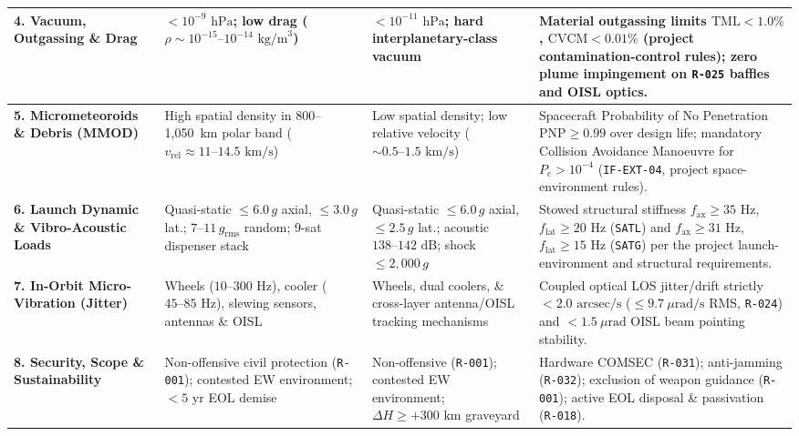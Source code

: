 \documentclass[11pt,a4paper]{article}
\providecommand{\abbr}[1]{#1}
\begin{document}
\begin{table}[H]
{\begin{tabularx}{\textwidth}{|>{\raggedright\arraybackslash}p{2.4cm}|>{\raggedright\arraybackslash}p{2.8cm}|>{\raggedright\arraybackslash}p{2.8cm}|>{\raggedright\arraybackslash}X|}
    \textbf{4. Vacuum, Outgassing \& Drag} & $< 10^{-9}\text{ hPa}$; low drag ($\rho \sim 10^{-15}\text{--}10^{-14}\text{ kg/m}^3$) & $< 10^{-11}\text{ hPa}$; hard interplanetary-class vacuum & Material outgassing limits $\mathrm{TML} < 1.0\%$, $\mathrm{CVCM} < 0.01\%$ (project contamination-control rules); zero plume impingement on \texttt{R-025} baffles and \abbr{OISL} optics. \\ \hline
    \textbf{5. Micrometeoroids \& Debris (\abbr{MMOD})} & High spatial density in 800--1,050~km polar band ($v_{\text{rel}} \approx 11\text{--}14.5\text{ km/s}$) & Low spatial density; low relative velocity ($\sim 0.5\text{--}1.5\text{ km/s}$) & Spacecraft Probability of No Penetration $\text{PNP} \ge 0.99$ over design life; mandatory Collision Avoidance Manoeuvre for $P_c > 10^{-4}$ (\texttt{IF-EXT-04}, project space-environment rules). \\ \hline
    \textbf{6. Launch Dynamic \& Vibro-Acoustic Loads} & Quasi-static $\le 6.0\,g$ axial, $\le 3.0\,g$ lat.; $7\text{--}11\,g_{\text{rms}}$ random; 9-sat dispenser stack & Quasi-static $\le 6.0\,g$ axial, $\le 2.5\,g$ lat.; acoustic $138\text{--}142\text{ dB}$; shock $\le 2{,}000\,g$ & Stowed structural stiffness $f_{\text{ax}} \ge 35\text{ Hz}$, $f_{\text{lat}} \ge 20\text{ Hz}$ (\texttt{SATL}) and $f_{\text{ax}} \ge 31\text{ Hz}$, $f_{\text{lat}} \ge 15\text{ Hz}$ (\texttt{SATG}) per the project launch-environment and structural requirements. \\ \hline
    \textbf{7. In-Orbit Micro-Vibration (Jitter)} & Wheels ($10\text{--}300\text{ Hz}$), cooler ($45\text{--}85\text{ Hz}$), slewing sensors, antennas \& \abbr{OISL} & Wheels, dual coolers, \& cross-layer antenna/\abbr{OISL} tracking mechanisms & Coupled optical \abbr{LOS} jitter/drift strictly $< 2.0\text{ arcsec/s}$ ($\le 9.7~\mu\mathrm{rad/s}$ RMS, \texttt{R-024}) and $< 1.5~\mu\mathrm{rad}$ \abbr{OISL} beam pointing stability. \\ \hline
    \textbf{8. Security, Scope \& Sustainability} & Non-offensive civil protection (\texttt{R-001}); contested EW environment; $< 5\text{ yr}$ \abbr{EOL} demise & Non-offensive (\texttt{R-001}); contested EW environment; $\Delta H \ge +300\text{ km}$ graveyard & Hardware \abbr{COMSEC} (\texttt{R-031}); anti-jamming (\texttt{R-032}); exclusion of weapon guidance (\texttt{R-001}); active \abbr{EOL} disposal \& passivation (\texttt{R-018}). \\ \hline
\end{tabularx}}
\end{table}
\end{document}

